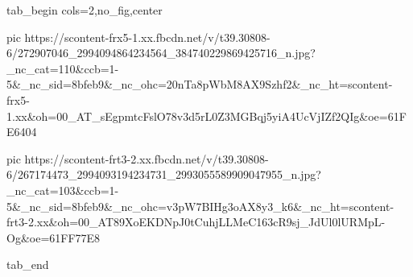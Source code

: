  
 
 
 
 


\ifcmt
  tab_begin cols=2,no_fig,center

     pic https://scontent-frx5-1.xx.fbcdn.net/v/t39.30808-6/272907046_2994094864234564_384740229869425716_n.jpg?_nc_cat=110&ccb=1-5&_nc_sid=8bfeb9&_nc_ohc=20nTa8pWbM8AX9Szhf2&_nc_ht=scontent-frx5-1.xx&oh=00_AT_sEgpmtcFslO78v3d5rL0Z3MGBqj5yiA4UcVjIZf2QIg&oe=61FE6404

     pic https://scontent-frt3-2.xx.fbcdn.net/v/t39.30808-6/267174473_2994093194234731_2993055589909047955_n.jpg?_nc_cat=103&ccb=1-5&_nc_sid=8bfeb9&_nc_ohc=v3pW7BIHg3oAX8y3_k6&_nc_ht=scontent-frt3-2.xx&oh=00_AT89XoEKDNpJ0tCuhjLLMeC163cR9sj_JdUl0lURMpL-Og&oe=61FF77E8

  tab_end
\fi
